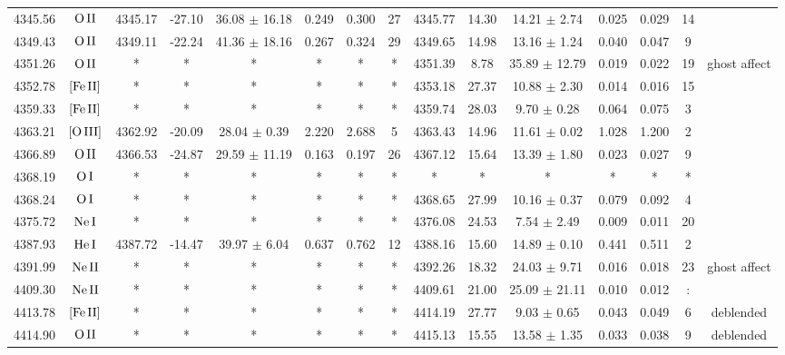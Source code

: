 \documentclass{article}
\begin{document}
\begin{table*}
\begin{adjustbox}{width=\textwidth}
\begin{tabular}{ccccccccccccccc}
4345.56 & $\mbox{O}\thinspace \mbox{II}$ & 4345.17 & -27.10 & 36.08 $\pm$ 16.18 & 0.249 & 0.300 & 27 & 4345.77 & 14.30 & 14.21 $\pm$ 2.74 & 0.025 & 0.029 & 14 &  \\
4349.43 & $\mbox{O}\thinspace \mbox{II}$ & 4349.11 & -22.24 & 41.36 $\pm$ 18.16 & 0.267 & 0.324 & 29 & 4349.65 & 14.98 & 13.16 $\pm$ 1.24 & 0.040 & 0.047 & 9 &  \\
4351.26 & $\mbox{O}\thinspace \mbox{II}$ & * & * & * & * & * & * & 4351.39 & 8.78 & 35.89 $\pm$ 12.79 & 0.019 & 0.022 & 19 &  ghost affect \\
4352.78 & $\mbox{[Fe}\thinspace \mbox{II]}$ & * & * & * & * & * & * & 4353.18 & 27.37 & 10.88 $\pm$ 2.30 & 0.014 & 0.016 & 15 &  \\
4359.33 & $\mbox{[Fe}\thinspace \mbox{II]}$ & * & * & * & * & * & * & 4359.74 & 28.03 & 9.70 $\pm$ 0.28 & 0.064 & 0.075 & 3 &  \\
4363.21 & $\mbox{[O}\thinspace \mbox{III]}$ & 4362.92 & -20.09 & 28.04 $\pm$ 0.39 & 2.220 & 2.688 & 5 & 4363.43 & 14.96 & 11.61 $\pm$ 0.02 & 1.028 & 1.200 & 2 &  \\
4366.89 & $\mbox{O}\thinspace \mbox{II}$ & 4366.53 & -24.87 & 29.59 $\pm$ 11.19 & 0.163 & 0.197 & 26 & 4367.12 & 15.64 & 13.39 $\pm$ 1.80 & 0.023 & 0.027 & 9 &  \\
4368.19 & $\mbox{O}\thinspace \mbox{I}$ & * & * & * & * & * & * & * & * & * & * & * & * &  \\
4368.24 & $\mbox{O}\thinspace \mbox{I}$ & * & * & * & * & * & * & 4368.65 & 27.99 & 10.16 $\pm$ 0.37 & 0.079 & 0.092 & 4 &  \\
4375.72 & $\mbox{Ne}\thinspace \mbox{I}$ & * & * & * & * & * & * & 4376.08 & 24.53 & 7.54 $\pm$ 2.49 & 0.009 & 0.011 & 20 &  \\
4387.93 & $\mbox{He}\thinspace \mbox{I}$ & 4387.72 & -14.47 & 39.97 $\pm$ 6.04 & 0.637 & 0.762 & 12 & 4388.16 & 15.60 & 14.89 $\pm$ 0.10 & 0.441 & 0.511 & 2 &  \\
4391.99 & $\mbox{Ne}\thinspace \mbox{II}$ & * & * & * & * & * & * & 4392.26 & 18.32 & 24.03 $\pm$ 9.71 & 0.016 & 0.018 & 23 &  ghost affect \\
4409.30 & $\mbox{Ne}\thinspace \mbox{II}$ & * & * & * & * & * & * & 4409.61 & 21.00 & 25.09 $\pm$ 21.11 & 0.010 & 0.012 & : &  \\
4413.78 & $\mbox{[Fe}\thinspace \mbox{II]}$ & * & * & * & * & * & * & 4414.19 & 27.77 & 9.03 $\pm$ 0.65 & 0.043 & 0.049 & 6 &  deblended \\
4414.90 & $\mbox{O}\thinspace \mbox{II}$ & * & * & * & * & * & * & 4415.13 & 15.55 & 13.58 $\pm$ 1.35 & 0.033 & 0.038 & 9 &  deblended \\

\end{tabular}
\end{adjustbox}
\end{table*}
\end{document}
